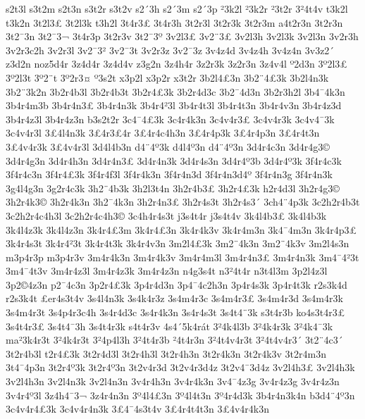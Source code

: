 {s2t3l
s3t2m
s2t3n
s3t2r
s3t2v
s2^^b43h
s2^^b43m
s2^^b43p
^^b23k2l
^^b23k2r
^^b23t2r
3^^b24t4v
t3k2l
t3k2n
3t2l3^^a3
3t2l3k
t3h2l
3t4r3^^a3
3t4r3h
3t2r3l
3t2r3k
3t2r3m
a4t2r3n
3t2r3n
3t2^^af3n
3t2^^af3^^ac
3t4r3p
3t2r3v
3t2^^af3^^ba
3v2l3^^a3
3v2^^a83^^a3
3v2l3h
3v2l3k
3v2l3n
3v2r3h
3v2r3c2h
3v2r3l
3v2^^af3^^b2
3v2^^af3t
3v2r3z
3v2^^af3z
3v4z4d
3v4z4h
3v4z4n
3v3z2^^b4
z3d2n
noz5d4r
3z4d4r
3z4d4v
z3g2n
3z4h4r
3z2r3k
3z2r3n
3z4v4l
^^ba2d3n
3^^ba2l3^^a3
3^^ba2l3t
3^^ba2^^a8t
3^^ba2r3^^a4
^^ba3s2t
x3p2l
x3p2r
x3t2r
3b2l4^^a33n
3b2^^a84^^a33k
3b2l4n3k
3b2^^a83k2n
3b2r4b3l
3b2r4b3t
3b2r4^^a33k
3b2r4d3c
3b2^^af4d3n
3b2r3h2l
3b4^^af4k3n
3b4r4m3b
3b4r4n3^^a3
3b4r4n3k
3b4r4^^b23l
3b4r4t3l
3b4r4t3n
3b4r4v3n
3b4r4z3d
3b4r4z3l
3b4r4z3n
b3s2t2r
3c4^^af4^^a33k
3c4r4k3n
3c4v4r3^^a3
3c4v4r3k
3c4v4^^af3k
3c4v4r3l
3^^a34l4n3k
3^^a34r3^^a34r
3^^a34r4c4h3n
3^^a34r4p3k
3^^a34r4p3n
3^^a34r4t3n
3^^a34v4r3k
3^^a34v4r3l
3d4l4b3n
d4^^a84^^ba3k
d4l4^^ba3n
d4^^a84^^ba3n
3d4r4c3n
3d4r4g3^^a9
3d4r4g3n
3d4r4h3n
3d4r4n3^^a3
3d4r4n3k
3d4r4s3n
3d4r4^^ba3b
3d4r4^^ba3k
3f4r4c3k
3f4r4c3n
3f4r4^^a33k
3f4r4f3l
3f4r4k3n
3f4r4n3d
3f4r4n3d4^^ba
3f4r4n3g
3f4r4n3k
3g4l4g3n
3g2r4c3k
3h2^^a84b3k
3h2l3t4n
3h2r4b3^^a3
3h2r4^^a33k
h2r4d3l
3h2r4g3^^a9
3h2r4k3^^a9
3h2r4k3n
3h2^^af4k3n
3h2r4n3^^a3
3h2r4s3t
3h2r4s3^^b4
3ch4^^a84p3k
3c2h2r4b3t
3c2h2r4c4h3l
3c2h2r4c4h3^^a9
3c4h4r4s3t
j3s4t4r
j3s4t4v
3k4l4b3^^a3
3k4l4b3k
3k4l4z3k
3k4l4z3n
3k4r4^^a33m
3k4r4^^a33n
3k4r4k3v
3k4r4m3n
3k4^^af4m3n
3k4r4p3^^a3
3k4r4s3t
3k4r4^^b23t
3k4r4t3k
3k4r4v3n
3m2l4^^a33k
3m2^^a84k3n
3m2^^a84k3v
3m2l4s3n
m3p4r3p
m3p4r3v
3m4r4k3n
3m4r4k3v
3m4r4m3l
3m4r4n3^^a3
3m4r4n3k
3m4^^af4^^b23t
3m4^^af4t3v
3m4r4z3l
3m4r4z3k
3m4r4z3n
n4g3s4t
n3^^b24t4r
n3t4l3m
3p2l4z3l
3p2^^a94z3n
p2^^af4c3n
3p2r4^^a33k
3p4r4d3n
3p4^^af4c2h3n
3p4r4s3k
3p4r4t3k
r2s3k4d
r2s3k4t
^^a3er4s3t4v
3s4l4n3k
3s4k4r3z
3s4m4r3c
3s4m4r3^^a3
3s4m4r3d
3s4m4r3k
3s4m4r3t
3s4p4r3c4h
3s4r4d3c
3s4r4k3n
3s4r4s3t
3s4t4^^a83k
s3t4r3b
ko4s3t4r3^^a3
3s4t4r3^^a3
3s4t4^^af3h
3s4t4r3k
s4t4r3v
4s4^^b45k4r^^e1t
3^^b24k4l3b
3^^b24k4r3k
3^^b24k4^^af3k
ma^^b23k4r3t
3^^b24k4r3t
3^^b24p4l3h
3^^b24t4r3b
^^b24t4r3n
3^^b24t4v4r3t
3^^b24t4v4r3^^b4
3t2^^a84c3^^b4
3t2r4b3l
t2r4^^a33k
3t2r4d3l
3t2r4h3l
3t2r4h3n
3t2r4k3n
3t2r4k3v
3t2r4m3n
3t4^^af4p3n
3t2r4^^ba3k
3t2r4^^ba3n
3t2v4r3d
3t2v4r3d4z
3t2v4^^af3d4z
3v2l4h3^^a3
3v2l4h3k
3v2l4h3n
3v2l4n3k
3v2l4n3n
3v4r4h3n
3v4r4k3n
3v4^^af4z3g
3v4r4z3g
3v4r4z3n
3v4r4^^ba3l
3z4h4^^af3^^ac
3z4r4n3n
3^^ba4l4^^a33n
3^^ba4l4t3n
3^^ba4r4d3k
3b4r4n3k4n
b3d4^^a84^^ba3n
3c4v4r4^^a33k
3c4v4r4n3k
3^^a34^^af4s3t4v
3^^a34r4t4t3n
3^^a34v4r4k3n
}

